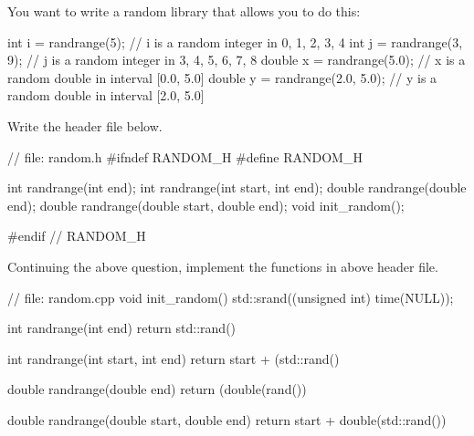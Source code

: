

\nextq
You want to write a random library that allows you to do this:
\begin{console}[fontsize=\footnotesize]
int i = randrange(5);           // i is a random integer in {0, 1, 2, 3, 4}
int j = randrange(3, 9);        // j is a random integer in {3, 4, 5, 6, 7, 8}
double x = randrange(5.0);      // x is a random double in interval [0.0, 5.0]
double y = randrange(2.0, 5.0); // y is a random double in interval [2.0, 5.0]
\end{console}
Write the header file below.
\\
\ANSWER
\begin{answercode}
// file: random.h
#ifndef RANDOM_H
#define RANDOM_H

int randrange(int end);
int randrange(int start, int end);
double randrange(double end);
double randrange(double start, double end);
void init_random();

#endif // RANDOM_H
\end{answercode}

\nextq
Continuing the above question, implement the functions in above header file.
\\
\ANSWER
\begin{answercode}
// file: random.cpp
void init_random()
{
    std::srand((unsigned int) time(NULL));
}

int randrange(int end)
{
    return std::rand() %
}

int randrange(int start, int end) {
    return start + (std::rand() %
}

double randrange(double end) {
    return (double(rand()) %
}

double randrange(double start, double end) {
    return start + double(std::rand()) %
}
\end{answercode}


